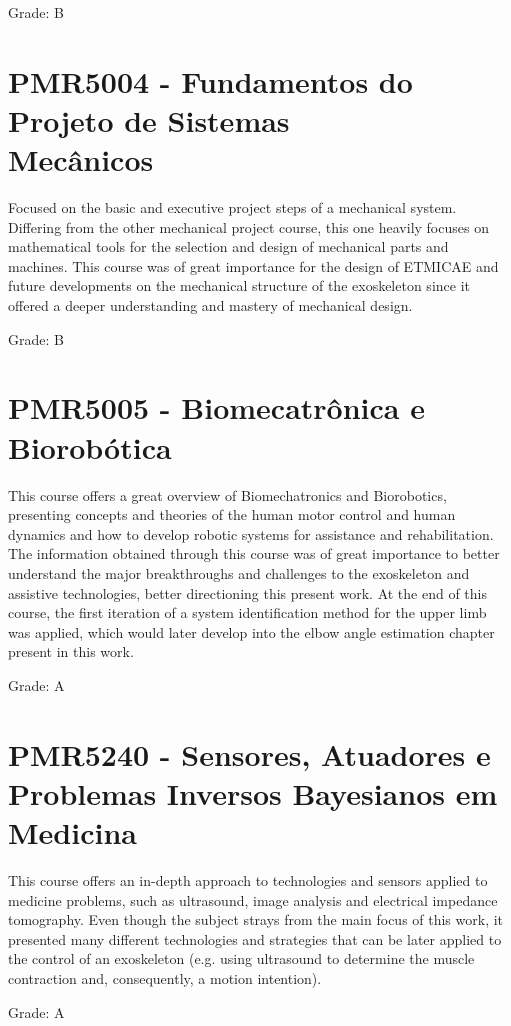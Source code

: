 Grade: B

\section{PMR5004 - Fundamentos do Projeto de Sistemas \\ Mecânicos}

Focused on the basic and executive project steps of a mechanical system. Differing from the other mechanical project course, this one heavily focuses on mathematical tools for the selection and design of mechanical parts and machines. This course was of great importance for the design of ETMICAE and future developments on the mechanical structure of the exoskeleton since it offered a deeper understanding and mastery of mechanical design.

Grade: B

\section{PMR5005 - Biomecatrônica e Biorobótica}

This course offers a great overview of Biomechatronics and Biorobotics, presenting concepts and theories of the human motor control and human dynamics and how to develop robotic systems for assistance and rehabilitation. The information obtained through this course was of great importance to better understand the major breakthroughs and challenges to the exoskeleton and assistive technologies, better directioning this present work. At the end of this course, the first iteration of a system identification method for the upper limb was applied, which would later develop into the elbow angle estimation chapter present in this work.

Grade: A

\section{PMR5240 - Sensores, Atuadores e Problemas Inversos Bayesianos em Medicina}

This course offers an in-depth approach to technologies and sensors applied to medicine problems, such as ultrasound, image analysis and electrical impedance tomography. Even though the subject strays from the main focus of this work, it presented many different technologies and strategies that can be later applied to the control of an exoskeleton (e.g. using ultrasound to determine the muscle contraction and, consequently, a motion intention).

Grade: A


\clearpage
